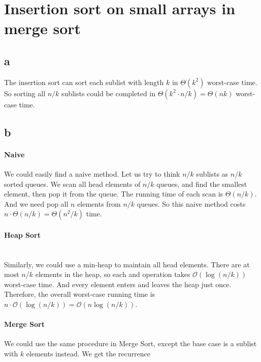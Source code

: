 \section{Insertion sort on small arrays in merge sort}

\subsection{a}

The insertion sort can sort each sublist with length $k$ in $\Theta(k^2)$ worst-case time.
So sorting all $n/k$ sublists could be completed in $\Theta(k^2 \cdot n/k) = \Theta(nk)$ worst-case time.


\subsection{b}

\paragraph{Naive}
We could easily find a naive method.
Let us try to think $n/k$ sublists as $n/k$ sorted queues.
We scan all head elements of $n/k$ queues, and find the smallest element, then pop it from the queue.
The running time of each scan is $\Theta(n/k)$.
And we need pop all $n$ elements from $n/k$ queues.
So this naive method costs $n \cdot \Theta(n/k) = \Theta(n^2/k)$ time.  

\paragraph{Heap Sort}

\\

Similarly, we could use a min-heap to maintain all head elements.
There are at most $n/k$ elements in the heap, so each  and  operation takes $\mathcal{O}(\log(n/k))$ worst-case time.
And every element enters and leaves the heap just once.
Therefore, the overall worst-case running time is $n \cdot \mathcal{O}(\log(n/k)) = \mathcal{O}(n\log(n/k))$.

\paragraph{Merge Sort}

We could use the same procedure in Merge Sort, except the base case is a sublist with $k$ elements instead.
We get the recurrence


